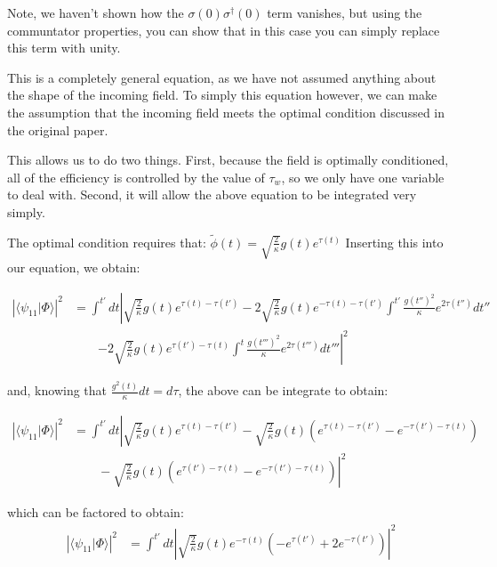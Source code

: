 \documentclass[12pt]{article}
\begin{document}
Note, we haven't shown how the $\sigma(0) \sigma^\dagger(0)$ term vanishes, but using the communtator properties, you can show that in this case you can simply replace this term with unity.

This is a completely general equation, as we have not assumed anything about the shape of the incoming field. 
To simply this equation however, we can make the assumption that the incoming field meets the optimal condition discussed
in the original paper.

This allows us to do two things. First, because the field is optimally conditioned, all of the efficiency is controlled by the value of $\tau_w$, so we only have one variable to deal with. Second, it will allow the above equation to be integrated very simply.

The optimal condition requires that: $\tilde{\phi}(t) = \sqrt{\frac{2}{\kappa}} g(t) e^{\tau(t)}$
Inserting this into our equation, we obtain:

\begin{align}
\left | \langle \psi_{11} | \Phi \rangle \right | ^2 &= \int^{t'} dt \left | \sqrt{\frac{2}{\kappa}} g(t) e^{\tau(t)-\tau(t')} \right.
      -2\sqrt{\frac{2}{\kappa}}g(t) e^{-\tau(t)-\tau(t')} \int^{t'} \frac{g(t'')^2}{\kappa} e^{2\tau(t'')} dt'' \\
       &\qquad \left.-2\sqrt{\frac{2}{\kappa}} g(t) e^{\tau(t')-\tau(t)} \int^t \frac{g(t''')^2}{\kappa} e^{2\tau(t''')} dt'''\right |^2
\end{align}

and, knowing that $\frac{g^2(t)}{\kappa}dt = d\tau$, the above can be integrate to obtain:

\begin{align}
\left | \langle \psi_{11} | \Phi \rangle \right | ^2 &=\int^{t'} dt \left| \sqrt{\frac{2}{\kappa}} g(t) e^{\tau(t)-\tau(t')} - \sqrt{\frac{2}{\kappa}} g(t)\left( e^{\tau(t)-\tau(t')} - e^{-\tau(t')-\tau(t)} \right )\right.\\
&\left. \qquad -\sqrt{\frac{2}{\kappa}} g(t) \left( e^{\tau(t')-\tau(t)} - e^{-\tau(t')-\tau(t)} \right)\right|^2 
\end{align}

which can be factored to obtain:
\begin{align}
\left | \langle \psi_{11} | \Phi \rangle \right | ^2  &= \int^{t'} dt \left|\sqrt{\frac{2}{\kappa}} g(t) e^{-\tau(t)} \left (- e^{\tau(t')} +2 e^{-\tau(t')} \right ) \right |^2 
\end{align}
\end{document}
